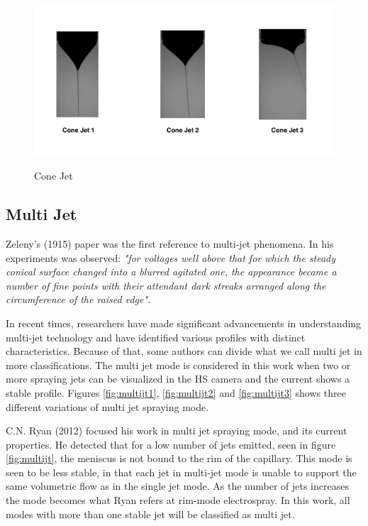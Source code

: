   \begin{figure}[H]
      \center
      \includegraphics[width=15cm]{Figuras/april/conjet.png}
      \label{fig:conjt}
      \caption{Cone Jet}
  \end{figure}


\subsection{Multi Jet}
\label{subsec:Multi Jet}

Zeleny's (1915)\cite{zeleny} paper was the first reference to multi-jet phenomena. In his experiments was observed:
\emph{"for voltages well above that for which the steady conical surface changed into a blurred agitated one, the appearance became a number of fine points with their attendant dark streaks arranged along the circumference of the raised edge".}

In recent times, researchers have made significant advancements in understanding multi-jet technology and have identified various profiles with distinct characteristics. Because of that, some authors can divide what we call multi jet in more classifications.
The multi jet mode is considered in this work when two or more spraying jets can be visualized in the HS camera and the current shows a stable profile. Figures \ref{fig:multijt1}, \ref{fig:multijt2} and \ref{fig:multijt3} shows three different variations of multi jet spraying mode.

C.N. Ryan (2012)\cite{Ryan} focused his work in multi jet spraying mode, and its current properties. 
He detected that for a low number of jets emitted, seen in figure \ref{fig:multijt}, the meniscus is not bound to the rim of the capillary. 
This mode is seen to be less stable, in that each jet in multi-jet mode is unable to support the same volumetric flow as in the single jet mode.
As the number of jets increases the mode becomes what Ryan refers at rim-mode electrospray. 
In this work, all modes with more than one stable jet will be classified as multi jet.



